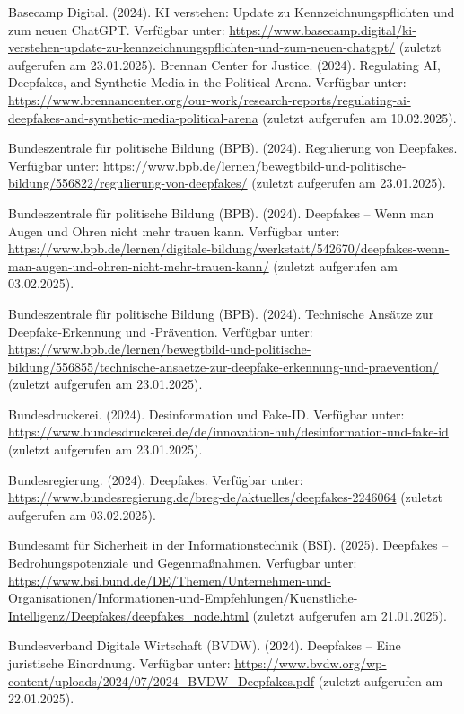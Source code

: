\documentclass[a4paper,12pt]{article}
\begin{document}
\begin{thebibliography}{99}
 Basecamp Digital. (2024). KI verstehen: Update zu Kennzeichnungspflichten und zum neuen ChatGPT.
Verfügbar unter: \url{https://www.basecamp.digital/ki-verstehen-update-zu-kennzeichnungspflichten-und-zum-neuen-chatgpt/} (zuletzt aufgerufen am 23.01.2025).
 Brennan Center for Justice. (2024). Regulating AI, Deepfakes, and Synthetic Media in the Political Arena.  
Verfügbar unter: \url{https://www.brennancenter.org/our-work/research-reports/regulating-ai-deepfakes-and-synthetic-media-political-arena} (zuletzt aufgerufen am 10.02.2025).

 Bundeszentrale für politische Bildung (BPB). (2024). Regulierung von Deepfakes. 
Verfügbar unter: \url{https://www.bpb.de/lernen/bewegtbild-und-politische-bildung/556822/regulierung-von-deepfakes/} (zuletzt aufgerufen am 23.01.2025).

 Bundeszentrale für politische Bildung (BPB). (2024). Deepfakes – Wenn man Augen und Ohren nicht mehr trauen kann. 
Verfügbar unter: \url{https://www.bpb.de/lernen/digitale-bildung/werkstatt/542670/deepfakes-wenn-man-augen-und-ohren-nicht-mehr-trauen-kann/} (zuletzt aufgerufen am 03.02.2025).

 Bundeszentrale für politische Bildung (BPB). (2024). Technische Ansätze zur Deepfake-Erkennung und -Prävention. 
Verfügbar unter: \url{https://www.bpb.de/lernen/bewegtbild-und-politische-bildung/556855/technische-ansaetze-zur-deepfake-erkennung-und-praevention/} (zuletzt aufgerufen am 23.01.2025).

 Bundesdruckerei. (2024). Desinformation und Fake-ID. 
Verfügbar unter: \url{https://www.bundesdruckerei.de/de/innovation-hub/desinformation-und-fake-id} (zuletzt aufgerufen am 23.01.2025).

 Bundesregierung. (2024). Deepfakes. 
Verfügbar unter: \url{https://www.bundesregierung.de/breg-de/aktuelles/deepfakes-2246064} (zuletzt aufgerufen am 03.02.2025).

 Bundesamt für Sicherheit in der Informationstechnik (BSI). (2025). Deepfakes – Bedrohungspotenziale und Gegenmaßnahmen. 
Verfügbar unter: \url{https://www.bsi.bund.de/DE/Themen/Unternehmen-und-Organisationen/Informationen-und-Empfehlungen/Kuenstliche-Intelligenz/Deepfakes/deepfakes_node.html} (zuletzt aufgerufen am 21.01.2025).

 Bundesverband Digitale Wirtschaft (BVDW). (2024). Deepfakes – Eine juristische Einordnung. 
Verfügbar unter: \url{https://www.bvdw.org/wp-content/uploads/2024/07/2024_BVDW_Deepfakes.pdf} (zuletzt aufgerufen am 22.01.2025).


\end{thebibliography}
\end{document}
